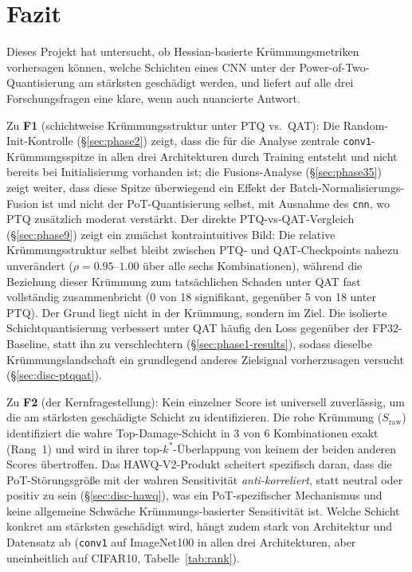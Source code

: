 \section{Fazit}
\label{sec:conclusion}

Dieses Projekt hat untersucht, ob Hessian-basierte Krümmungsmetriken vorhersagen können, welche Schichten eines CNN unter der Power-of-Two-Quantisierung am stärksten geschädigt werden, und liefert auf alle drei Forschungsfragen eine klare, wenn auch nuancierte Antwort.
\par\medskip

Zu \textbf{F1} (schichtweise Krümmungsstruktur unter PTQ vs.\ QAT): Die Random-Init-Kontrolle (\S\ref{sec:phase2}) zeigt, dass die für die Analyse zentrale \texttt{conv1}-Krümmungsspitze in allen drei Architekturen durch Training entsteht und nicht bereits bei Initialisierung vorhanden ist; die Fusions-Analyse (\S\ref{sec:phase35}) zeigt weiter, dass diese Spitze überwiegend ein Effekt der Batch-Normalisierungs-Fusion ist und nicht der PoT-Quantisierung selbst, mit Ausnahme des \texttt{cnn}, wo PTQ zusätzlich moderat verstärkt. Der direkte PTQ-vs-QAT-Vergleich (\S\ref{sec:phase9}) zeigt ein zunächst kontraintuitives Bild: Die relative Krümmungsstruktur selbst bleibt zwischen PTQ- und QAT-Checkpoints nahezu unverändert ($\rho=0.95$--$1.00$ über alle sechs Kombinationen), während die Beziehung dieser Krümmung zum tatsächlichen Schaden unter QAT fast vollständig zusammenbricht (0 von 18 signifikant, gegenüber 5 von 18 unter PTQ). Der Grund liegt nicht in der Krümmung, sondern im Ziel. Die isolierte Schichtquantisierung verbessert unter QAT häufig den Loss gegenüber der FP32-Baseline, statt ihn zu verschlechtern (\S\ref{sec:phase1-results}), sodass dieselbe Krümmungslandschaft ein grundlegend anderes Zielsignal vorherzusagen versucht (\S\ref{sec:disc-ptqqat}).
\par\medskip

Zu \textbf{F2} (der Kernfragestellung): Kein einzelner Score ist universell zuverlässig, um die am stärksten geschädigte Schicht zu identifizieren. Die rohe Krümmung ($S_{\mathrm{raw}}$) identifiziert die wahre Top-Damage-Schicht in 3 von 6 Kombinationen exakt (Rang~1) und wird in ihrer top-$k^*$-Überlappung von keinem der beiden anderen Scores übertroffen. Das HAWQ-V2-Produkt scheitert spezifisch daran, dass die PoT-Störungsgröße mit der wahren Sensitivität \emph{anti-korreliert}, statt neutral oder positiv zu sein (\S\ref{sec:disc-hawq}), was ein PoT-spezifischer Mechanismus und keine allgemeine Schwäche Krümmungs-basierter Sensitivität ist. Welche Schicht konkret am stärksten geschädigt wird, hängt zudem stark von Architektur und Datensatz ab (\texttt{conv1} auf ImageNet100 in allen drei Architekturen, aber uneinheitlich auf CIFAR10, Tabelle~\ref{tab:rank}).
\par\medskip

